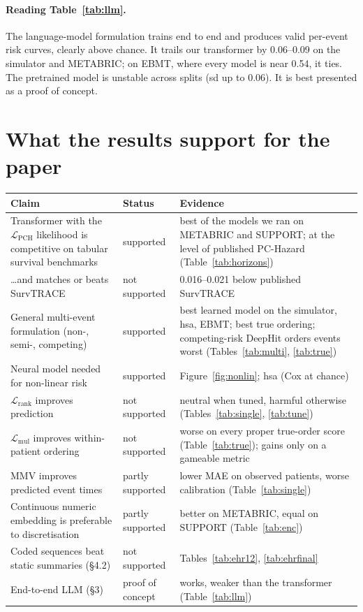\documentclass[11pt,a4paper]{article}
\newcommand{\Lpch}{$\mathcal{L}_{\mathrm{PCH}}$}
\newcommand{\Lrank}{$\mathcal{L}_{\mathrm{rank}}$}
\newcommand{\Lmul}{$\mathcal{L}_{\mathrm{mul}}$}
\begin{document}
\paragraph{Reading Table~\ref{tab:llm}.} The language-model formulation trains end to end and produces valid per-event
risk curves, clearly above chance. It trails our transformer by 0.06--0.09 on the simulator and METABRIC; on EBMT,
where every model is near 0.54, it ties. The pretrained model is unstable across splits (sd up to 0.06). It is best
presented as a proof of concept.

\section{What the results support for the paper}\label{sec:claims}
\begin{table}[H]\centering\small
\begin{tabular}{p{5.8cm}p{2.7cm}p{6.3cm}}
\toprule
Claim & Status & Evidence \\
\midrule
Transformer with the \Lpch{} likelihood is competitive on tabular survival benchmarks & supported & best of the
models we ran on METABRIC and SUPPORT; at the level of published PC-Hazard (Table~\ref{tab:horizons}) \\
\dots and matches or beats SurvTRACE & not supported & 0.016--0.021 below published SurvTRACE \\
General multi-event formulation (non-, semi-, competing) & supported & best learned model on the simulator, hsa, EBMT;
best true ordering; competing-risk DeepHit orders events worst (Tables~\ref{tab:multi}, \ref{tab:true}) \\
Neural model needed for non-linear risk & supported & Figure~\ref{fig:nonlin}; hsa (Cox at chance) \\
\Lrank{} improves prediction & not supported & neutral when tuned, harmful otherwise (Tables~\ref{tab:single}, \ref{tab:tune}) \\
\Lmul{} improves within-patient ordering & not supported & worse on every proper true-order score
(Table~\ref{tab:true}); gains only on a gameable metric \\
MMV improves predicted event times & partly supported & lower MAE on observed patients, worse calibration
(Table~\ref{tab:single}) \\
Continuous numeric embedding is preferable to discretisation & partly supported & better on METABRIC, equal on
SUPPORT (Table~\ref{tab:enc}) \\
Coded sequences beat static summaries (\S4.2) & not supported & Tables~\ref{tab:ehr12}, \ref{tab:ehrfinal} \\
End-to-end LLM (\S3) & proof of concept & works, weaker than the transformer (Table~\ref{tab:llm}) \\
\bottomrule
\end{tabular}
\end{table}
\end{document}
